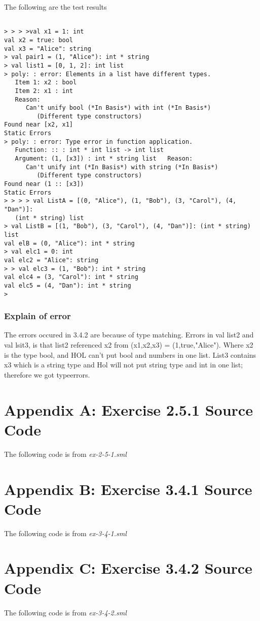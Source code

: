 \documentclass{report}
\begin{document}
The following are the test results
\setcounter{sessioncount}{0}
\begin{session}
  \begin{scriptsize}
\begin{verbatim}

> > > >val x1 = 1: int
val x2 = true: bool
val x3 = "Alice": string
> val pair1 = (1, "Alice"): int * string
> val list1 = [0, 1, 2]: int list
> poly: : error: Elements in a list have different types.
   Item 1: x2 : bool
   Item 2: x1 : int
   Reason:
      Can't unify bool (*In Basis*) with int (*In Basis*)
         (Different type constructors)
Found near [x2, x1]
Static Errors
> poly: : error: Type error in function application.
   Function: :: : int * int list -> int list
   Argument: (1, [x3]) : int * string list   Reason:
      Can't unify int (*In Basis*) with string (*In Basis*)
         (Different type constructors)
Found near (1 :: [x3])
Static Errors
> > > > val ListA = [(0, "Alice"), (1, "Bob"), (3, "Carol"), (4, "Dan")]:
   (int * string) list
> val ListB = [(1, "Bob"), (3, "Carol"), (4, "Dan")]: (int * string) list
val elB = (0, "Alice"): int * string
> val elc1 = 0: int
val elc2 = "Alice": string
> > val elc3 = (1, "Bob"): int * string
val elc4 = (3, "Carol"): int * string
val elc5 = (4, "Dan"): int * string
> 
\end{verbatim}
  \end{scriptsize}
\end{session}

\subsection{Explain of error}
\label{sec:explain-error}
The errors occured in 3.4.2 are because of type matching. Errors in val list2 and val lsit3, is that list2 referenced x2 from (x1,x2,x3) = (1,true,"Alice"). Where x2 is the type bool, and HOL can't put bool and numbers in one list. List3 contains x3 which is a string type and Hol will not put string type and int in one list; therefore we got typeerrors.

\chapter{Appendix A: Exercise 2.5.1 Source Code}
\label{cha:appendix-a:-exercise}
The following code is from \emph{ex-2-5-1.sml}


\chapter{Appendix B: Exercise 3.4.1 Source Code}
\label{cha:appendix-b:-exercise}
The following code is from \emph{ex-3-4-1.sml}


\chapter{Appendix C: Exercise 3.4.2 Source Code}
\label{cha:appendix-c:-exercise}
The following code is from \emph{ex-3-4-2.sml}

\end{document}
